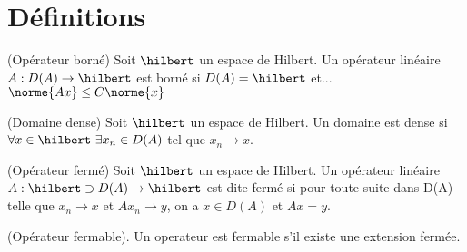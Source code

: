 
\section{Définitions}



\begin{defi}
    (Opérateur borné)
    Soit $\hilbert$ un espace de Hilbert. Un opérateur linéaire
    $A: D(A) \rightarrow \hilbert$
    est borné si $D(A) = \hilbert$ et...
    $\norme{Ax} \leq C\norme{x}$
\end{defi}








\begin{defi}
    (Domaine dense)
    Soit $\hilbert$ un espace de Hilbert. Un domaine est dense si
    $\forall x \in \hilbert \ \exists x_n \in D(A)$ tel que $x_n \rightarrow x$.
\end{defi}







\begin{defi}
    (Opérateur fermé)
    Soit $\hilbert$ un espace de Hilbert. Un opérateur linéaire
    $A: \hilbert \supset D(A) \rightarrow \hilbert$
    est dite fermé si pour toute suite dans D(A) telle que $x_n \rightarrow x$
    et $A x_n \rightarrow y$,
    on a $x \in D(A)$ et $Ax = y$.
\end{defi}






\begin{defi}
    (Opérateur fermable).
    Un operateur est fermable s'il existe une extension fermée.
\end{defi}

